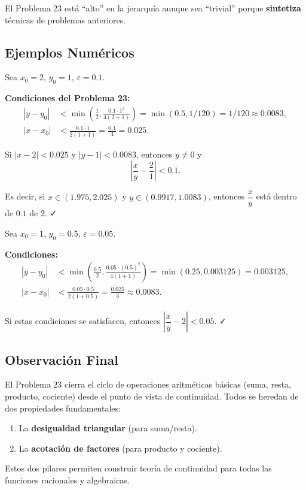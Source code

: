 El Problema 23 está ``alto'' en la jerarquía aunque sea ``trivial'' porque \textbf{sintetiza} técnicas de problemas anteriores.

\subsection*{Ejemplos Numéricos}

\begin{ejemplo}
Sea $x_0 = 2$, $y_0 = 1$, $\varepsilon = 0.1$.

\textbf{Condiciones del Problema 23:}
\begin{align*}
|y - y_0| &< \min\left(\frac{1}{2}, \frac{0.1 \cdot 1^2}{4(2+1)}\right) = \min(0.5, 1/120) = 1/120 \approx 0.0083, \\
|x - x_0| &< \frac{0.1 \cdot 1}{2(1+1)} = \frac{0.1}{4} = 0.025.
\end{align*}

Si $|x - 2| < 0.025$ y $|y - 1| < 0.0083$, entonces $y \neq 0$ y
\[
\left|\frac{x}{y} - \frac{2}{1}\right| < 0.1.
\]

Es decir, si $x \in (1.975, 2.025)$ y $y \in (0.9917, 1.0083)$, entonces $\dfrac{x}{y}$ está dentro de $0.1$ de $2$. ✓
\end{ejemplo}

\begin{ejemplo}
Sea $x_0 = 1$, $y_0 = 0.5$, $\varepsilon = 0.05$.

\textbf{Condiciones:}
\begin{align*}
|y - y_0| &< \min\left(\frac{0.5}{2}, \frac{0.05 \cdot (0.5)^2}{4(1+1)}\right) = \min(0.25, 0.003125) = 0.003125, \\
|x - x_0| &< \frac{0.05 \cdot 0.5}{2(1+0.5)} = \frac{0.025}{3} \approx 0.0083.
\end{align*}

Si estas condiciones se satisfacen, entonces $\left|\dfrac{x}{y} - 2\right| < 0.05$. ✓
\end{ejemplo}

\subsection*{Observación Final}

El Problema 23 cierra el ciclo de operaciones aritméticas básicas (suma, resta, producto, cociente) desde el punto de vista de continuidad. Todos se heredan de dos propiedades fundamentales:
\begin{enumerate}
\item La \textbf{desigualdad triangular} (para suma/resta).
\item La \textbf{acotación de factores} (para producto y cociente).
\end{enumerate}

Estos dos pilares permiten construir teoría de continuidad para todas las funciones racionales y algebraicas.
